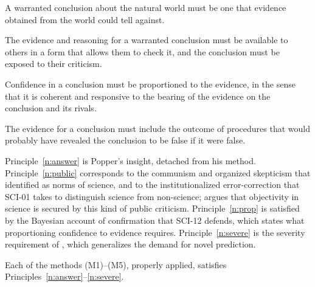 \documentclass{situationist-preprint}
\begin{document}
\begin{principle}[Answerability]\label{n:answer}
A warranted conclusion about the natural world must be one that evidence obtained from the world could tell against.
\end{principle}

\begin{principle}\label{n:public}
The evidence and reasoning for a warranted conclusion must be available to others in a form that allows them to check it, and the conclusion must be exposed to their criticism.
\end{principle}

\begin{principle}[Proportion]\label{n:prop}
Confidence in a conclusion must be proportioned to the evidence, in the sense that it is coherent and responsive to the bearing of the evidence on the conclusion and its rivals.
\end{principle}

\begin{principle}[Severity]\label{n:severe}
The evidence for a conclusion must include the outcome of procedures that would probably have revealed the conclusion to be false if it were false.
\end{principle}

Principle~\ref{n:answer} is Popper's insight, detached from his method. Principle~\ref{n:public} corresponds to the communism and organized skepticism that \citet{Merton1973} identified as norms of science, and to the institutionalized error-correction that SCI-01 takes to distinguish science from non-science; \citet{Longino1990} argues that objectivity in science is secured by this kind of public criticism. Principle~\ref{n:prop} is satisfied by the Bayesian account of confirmation that SCI-12 defends, which states what proportioning confidence to evidence requires. Principle~\ref{n:severe} is the severity requirement of \citet{Mayo1996}, which generalizes the demand for novel prediction.

\begin{proposition}\label{p:satisfy}
Each of the methods (M1)--(M5), properly applied, satisfies Principles~\ref{n:answer}--\ref{n:severe}.
\end{proposition}
\end{document}

